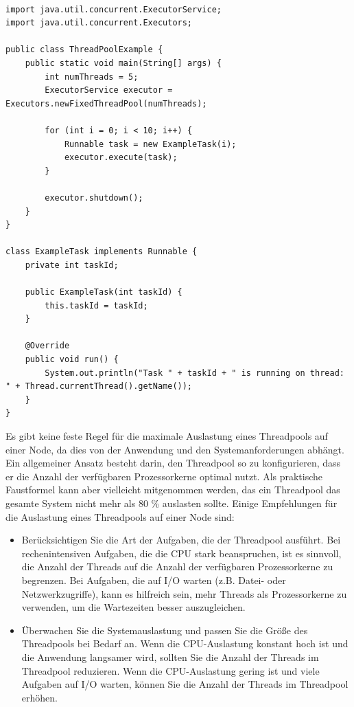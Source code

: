 \documentclass[../vs-script-first-v01.tex]{subfiles}
\begin{document}
\label{cha:chapter_name}

\begin{lstlisting}[caption={ExecutorService-Klasse},captionpos=b,label={lst:executor}]

import java.util.concurrent.ExecutorService;
import java.util.concurrent.Executors;

public class ThreadPoolExample {
    public static void main(String[] args) {
        int numThreads = 5;
        ExecutorService executor = Executors.newFixedThreadPool(numThreads);

        for (int i = 0; i < 10; i++) {
            Runnable task = new ExampleTask(i);
            executor.execute(task);
        }

        executor.shutdown();
    }
}

class ExampleTask implements Runnable {
    private int taskId;

    public ExampleTask(int taskId) {
        this.taskId = taskId;
    }

    @Override
    public void run() {
        System.out.println("Task " + taskId + " is running on thread: " + Thread.currentThread().getName());
    }
}
\end{lstlisting}


Es gibt keine feste Regel für die maximale Auslastung eines Threadpools auf einer Node, da dies von der Anwendung und den Systemanforderungen abhängt. Ein allgemeiner Ansatz besteht darin, den Threadpool so zu konfigurieren, dass er die Anzahl der verfügbaren Prozessorkerne optimal nutzt. Als praktische Faustformel kann aber vielleicht mitgenommen werden, das ein Threadpool das gesamte System nicht mehr als 80 \% auslasten sollte.
Einige Empfehlungen für die Auslastung eines Threadpools auf einer Node sind:
\begin{itemize}
\item Berücksichtigen Sie die Art der Aufgaben, die der Threadpool ausführt. Bei rechenintensiven Aufgaben, die die CPU stark beanspruchen, ist es sinnvoll, die Anzahl der Threads auf die Anzahl der verfügbaren Prozessorkerne zu begrenzen. Bei Aufgaben, die auf I/O warten (z.B. Datei- oder Netzwerkzugriffe), kann es hilfreich sein, mehr Threads als Prozessorkerne zu verwenden, um die Wartezeiten besser auszugleichen.
\item Überwachen Sie die Systemauslastung und passen Sie die Größe des Threadpools bei Bedarf an. Wenn die CPU-Auslastung konstant hoch ist und die Anwendung langsamer wird, sollten Sie die Anzahl der Threads im Threadpool reduzieren. Wenn die CPU-Auslastung gering ist und viele Aufgaben auf I/O warten, können Sie die Anzahl der Threads im Threadpool erhöhen.
\end{itemize}
\end{document}

